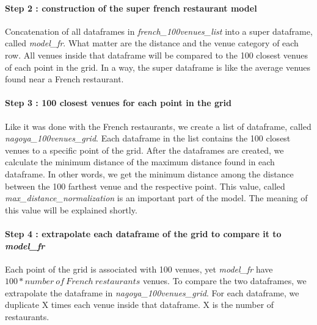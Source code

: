 \documentclass[12pt,a4paper]{article}
\begin{document}
\paragraph{Step 2 : construction of the super french restaurant model}
Concatenation of all dataframes in \textit{french\_100venues\_list} into a super dataframe, called \textit{model\_fr}. What matter are the distance and the venue category of each row. All venues inside that dataframe will be compared to the 100 closest venues of each point in the grid. In a way, the super dataframe is like the average venues found near a French restaurant.

\paragraph{Step 3 : 100 closest venues for each point in the grid}
Like it was done with the French restaurants, we create a list of dataframe, called \textit{nagoya\_100venues\_grid}. Each dataframe in the list contains the 100 closest venues to a specific point of the grid. After the dataframes are created, we calculate the minimum distance of the maximum distance found in each dataframe. In other words, we get the minimum distance among the distance between the 100 farthest venue and the respective point. This value, called \textit{max\_distance\_normalization} is an important part of the model. The meaning of this value will be explained shortly.

\paragraph{Step 4 : extrapolate each dataframe of the grid to compare it to \textit{model\_fr}}
Each point of the grid is associated with 100 venues, yet \textit{model\_fr} have $100 * number \ of \ French \ restaurants$ venues. To compare the two dataframes, we extrapolate the dataframe in \textit{nagoya\_100venues\_grid}. For each dataframe, we duplicate X times each venue inside that dataframe. X is the number of restaurants.
\end{document}
